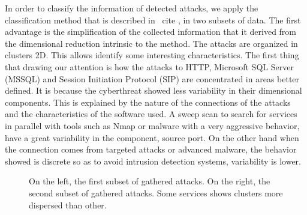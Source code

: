 \documentclass[a4paper]{llncs}
\begin{document}
In order to classify the information of detected attacks, we apply the classification method that is described in \ cite {}, in two subsets of data. The first advantage is the simplification of the collected information that it derived from the dimensional reduction intrinsic to the method. The attacks are organized in clusters 2D.  This allows identify some interesting characteristics. The first thing that drawing our attention is how the attacks to HTTP, Microsoft SQL Server (MSSQL) and Session Initiation Protocol (SIP) are concentrated in areas better defined. It is because the cyberthreat showed less variability in their dimensional components. This is explained by the nature of the connections of the attacks and the characteristics of the software used. A sweep scan to search for services in parallel with tools such as Nmap\cite{nmap} or malware with a very aggressive behavior, have a great variability in the component, source port. On the other hand when the connection comes from targeted attacks or advanced malware, the behavior showed is discrete so as to avoid intrusion detection systems, variability is lower.

\begin{figure}[h]
	\label{fig:intvsextDionaea}
	\label{fig:intvsextKippo}
	\caption{On the left, the first subset of gathered attacks. On the right, the second subset of gathered attacks. Some services shows clusters more dispersed than other.}
\end{figure}
\end{document}

